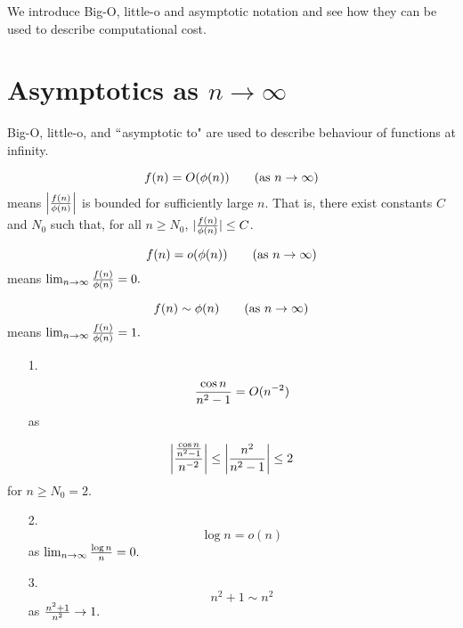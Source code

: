 
We introduce Big-O, little-o and asymptotic notation and see how they can be used to describe computational cost. 

\section{Asymptotics as $n \ensuremath{\rightarrow} \ensuremath{\infty}$}
Big-O, little-o, and \ensuremath{\ldq}asymptotic to" are used to describe behaviour of functions at infinity. 

\begin{definition}[Big-O] 
\[
f(n) = O(\ensuremath{\phi}(n)) \qquad \hbox{(as $n \ensuremath{\rightarrow} \ensuremath{\infty}$)}
\]
means $\left|{f(n) \over \ensuremath{\phi}(n)}\right|$ is bounded for sufficiently large $n$. That is, there exist constants $C$ and $N_0$ such  that, for all $n \geq N_0$, $|{f(n) \over \ensuremath{\phi}(n)}| \leq C$. \end{definition}

\begin{definition}[little-O] 
\[
f(n) = o(\ensuremath{\phi}(n)) \qquad \hbox{(as $n \ensuremath{\rightarrow} \ensuremath{\infty}$)}
\]
means $\lim_{n \ensuremath{\rightarrow} \ensuremath{\infty}} {f(n) \over \ensuremath{\phi}(n)} = 0.$ \end{definition}

\begin{definition}[asymptotic to] 
\[
f(n) \ensuremath{\sim} \ensuremath{\phi}(n) \qquad \hbox{(as $n \ensuremath{\rightarrow} \ensuremath{\infty}$)}
\]
means $\lim_{n \ensuremath{\rightarrow} \ensuremath{\infty}} {f(n) \over \ensuremath{\phi}(n)} = 1.$ \end{definition}

\begin{example}

\begin{itemize}
\item[1. ] \[
{\cos n \over n^2 -1} = O(n^{-2})
\]
as

\end{itemize}
\[
\left|{{\cos n \over n^2 -1} \over n^{-2}} \right| \leq \left| n^2 \over n^2 -1 \right|  \leq 2
\]
for $n \geq N_0 = 2$.

\begin{itemize}
\item[2. ] \[
\log n = o(n)
\]
as $\lim_{n \ensuremath{\rightarrow} \ensuremath{\infty}} {\log n \over n} = 0.$


\item[3. ] \[
n^2 + 1 \ensuremath{\sim} n^2
\]
as ${n^2 +1 \over n^2} \ensuremath{\rightarrow} 1.$

\end{itemize}
\end{example}

